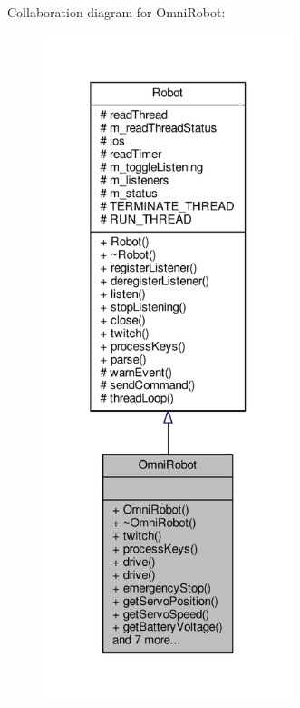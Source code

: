 Collaboration diagram for Omni\+Robot\+:
\nopagebreak
\begin{figure}[H]
\begin{center}
\leavevmode
\includegraphics[height=550pt]{class_omni_robot__coll__graph}
\end{center}
\end{figure}

